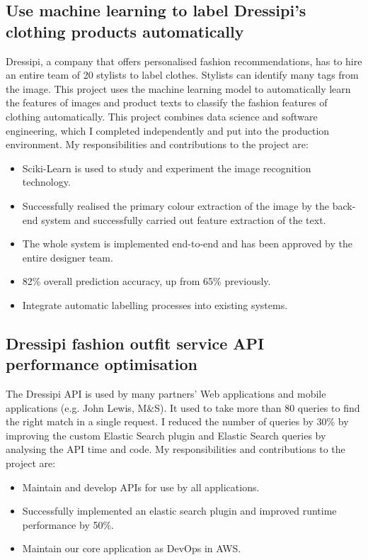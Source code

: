 \documentclass[a4paper]{twentysecondcv-english} %
\begin{document}
\subsection{Use machine learning to label Dressipi's clothing products automatically}
Dressipi, a company that offers personalised fashion recommendations, has to hire an entire team of 20 stylists to label clothes. Stylists can identify many tags from the image. This project uses the machine learning model to automatically learn the features of images and product texts to classify the fashion features of clothing automatically. This project combines data science and software engineering, which I completed independently and put into the production environment. My responsibilities and contributions to the project are:
\begin{itemize}
    \item Sciki-Learn is used to study and experiment the image recognition technology.
    \item Successfully realised the primary colour extraction of the image by the back-end system and successfully carried out feature extraction of the text.
    \item The whole system is implemented end-to-end and has been approved by the entire designer team.
    \item 82\% overall prediction accuracy, up from 65\% previously.
    \item Integrate automatic labelling processes into existing systems.
\end{itemize}

\newpage %
\makesidebar
\subsection{Dressipi fashion outfit service API performance optimisation}
The Dressipi API is used by many partners' Web applications and mobile applications (e.g. John Lewis, M\&S). It used to take more than 80 queries to find the right match in a single request. I reduced the number of queries by 30\% by improving the custom Elastic Search plugin and Elastic Search queries by analysing the API time and code. My responsibilities and contributions to the project are:
\begin{itemize}
    \item Maintain and develop APIs for use by all applications.
    \item Successfully implemented an elastic search plugin and improved runtime performance by 50\%.
    \item Maintain our core application as DevOps in AWS.
\end{itemize}
\end{document}
